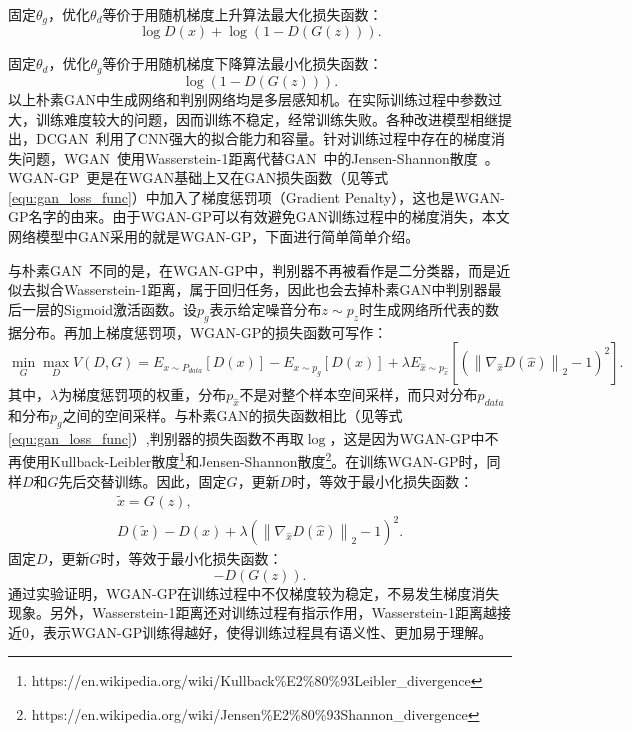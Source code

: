 \noindent 固定$\theta_{g}$，优化$\theta_{d}$等价于用随机梯度上升算法最大化损失函数：
\begin{equation*}
\log D\left(x\right)+\log \left(1-D\left(G\left(z\right)\right)\right).
\end{equation*}

\noindent 固定$\theta_{d}$，优化$\theta_{g}$等价于用随机梯度下降算法最小化损失函数：
\begin{equation*}
\log \left(1-D\left(G\left(z\right)\right)\right).
\end{equation*}
\noindent 以上朴素GAN中生成网络和判别网络均是多层感知机。在实际训练过程中参数过大，训练难度较大的问题，因而训练不稳定，经常训练失败。各种改进模型相继提出，DCGAN~\cite{radford2015unsupervised}利用了CNN强大的拟合能力和容量。针对训练过程中存在的梯度消失问题，WGAN~\cite{gulrajani2017improved}使用Wasserstein-1距离代替GAN~\cite{goodfellow2014generative}中的Jensen-Shannon散度~\cite{arjovsky2017towards}。WGAN-GP~\cite{gulrajani2017improved}更是在WGAN基础上又在GAN损失函数（见等式\ref{equ:gan_loss_func}）中加入了梯度惩罚项（Gradient Penalty），这也是WGAN-GP名字的由来。由于WGAN-GP可以有效避免GAN训练过程中的梯度消失，本文网络模型中GAN采用的就是WGAN-GP，下面进行简单简单介绍。

与朴素GAN~\cite{goodfellow2014generative}不同的是，在WGAN-GP中，判别器不再被看作是二分类器，而是近似去拟合Wasserstein-1距离，属于回归任务，因此也会去掉朴素GAN中判别器最后一层的Sigmoid激活函数。设$p_g$表示给定噪音分布$z\sim p_z$时生成网络所代表的数据分布。再加上梯度惩罚项，WGAN-GP的损失函数可写作：
\begin{equation}\label{wgan_gp_loss_func}
\min _{G} \max _{D} V(D, G)=E_{x \sim P_{d a t a}}[D(x)]-E_{x \sim p_{g}}[D(x)]+\lambda E_{\hat{x} \sim p_{\hat{x}}}\left[\left(\left\|\nabla_{\hat{x}} D(\hat{x})\right\|_{2}-1\right)^{2}\right].
\end{equation}
其中，$\lambda$为梯度惩罚项的权重，分布$p_{\hat{x}}$不是对整个样本空间采样，而只对分布$p_{data}$和分布$p_{g}$之间的空间采样。与朴素GAN的损失函数相比（见等式\ref{equ:gan_loss_func}）,判别器的损失函数不再取$\log$，这是因为WGAN-GP中不再使用Kullback-Leibler散度\footnote{https://en.wikipedia.org/wiki/Kullback\%E2\%80\%93Leibler\_divergence}和Jensen-Shannon散度\footnote{https://en.wikipedia.org/wiki/Jensen\%E2\%80\%93Shannon\_divergence}。在训练WGAN-GP时，同样$D$和$G$先后交替训练。因此，固定$G$，更新$D$时，等效于最小化损失函数：
\begin{gather*}
\tilde{{x}} = G_{}({z}), \\
D(\tilde{{x}})-D({x})+\lambda\left(\left\|\nabla_{\hat{x}} D(\hat{x})\right\|_{2}-1\right)^{2}.
\end{gather*}
\noindent 固定$D$，更新$G$时，等效于最小化损失函数：
\begin{equation*}
-D\left(G(z)\right).
\end{equation*}
通过实验证明，WGAN-GP在训练过程中不仅梯度较为稳定，不易发生梯度消失现象。另外，Wasserstein-1距离还对训练过程有指示作用，Wasserstein-1距离越接近0，表示WGAN-GP训练得越好，使得训练过程具有语义性、更加易于理解。

